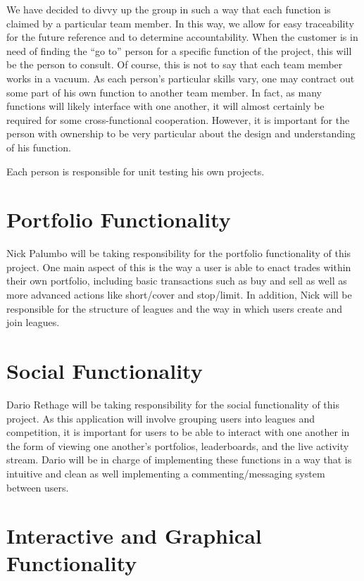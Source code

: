 \documentclass[11pt,letterpaper,oneside]{memoir}
\begin{document}
We have decided to divvy up the group in such a way that each function is claimed by a
particular team member. In this way, we allow for easy traceability for the future reference
and to determine accountability. When the customer is in need of finding the ``go to'' person for
a specific function of the project, this will be the person to consult. Of course, this
is not to say that each team member works in a vacuum. As each person's particular skills vary,
one may contract out some part of his own function to another team member. In fact, as many
functions will likely interface with one another, it will almost certainly be required for some
cross-functional cooperation. However, it is important for the person with ownership to be very
particular about the design and understanding of his function.

Each person is responsible for unit testing his own projects.

\section{Portfolio Functionality}
Nick Palumbo will be taking responsibility for the portfolio functionality of this project. One main
aspect of this is the way a user is able to enact trades within their own portfolio, including basic
transactions such as buy and sell as well as more advanced actions like short/cover and stop/limit.
In addition, Nick will be responsible for the structure of leagues and the way in which users create
and join leagues.

\section{Social Functionality}

Dario Rethage will be taking responsibility for the social functionality of this project. As this
application will involve grouping users into leagues and competition, it is important for users
to be able to interact with one another in the form of viewing one another's portfolios,
leaderboards, and the live activity stream. Dario will be in charge of implementing these functions
in a way that is intuitive and clean as well implementing a commenting/messaging system
between users.

\section{Interactive and Graphical Functionality}
\end{document}

